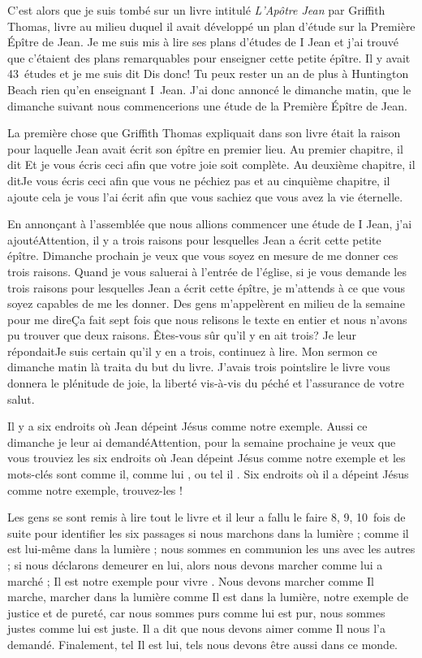 C’est alors que je suis tombé sur un livre intitulé \emph{L’Apôtre Jean} par Griffith Thomas, livre au milieu duquel il avait
développé un plan d’étude sur la Première Épître de Jean. Je me suis mis à lire ses plans d’études de I Jean et j'ai
trouvé que c’étaient des plans remarquables pour enseigner cette petite épître. Il y avait 43~études et je me suis dit\frcolon
\og Dis donc! Tu peux rester un an de plus à Huntington Beach rien qu’en enseignant I~Jean. \fg{} J'ai donc annoncé le
dimanche matin, que le dimanche suivant nous commencerions une étude de la Première Épître de Jean.

La première chose que Griffith Thomas expliquait dans son livre était la raison pour laquelle Jean avait écrit son
épître en premier lieu. Au premier chapitre, il dit \og Et je vous écris ceci afin que votre joie soit complète\fg{}. Au deuxième
chapitre, il dit\frcolon\og Je vous écris ceci afin que vous ne péchiez pas \fg{} et au cinquième chapitre, il ajoute \og cela je vous l’ai
écrit afin que vous sachiez que vous avez la vie éternelle\fg{}.

En annonçant à l'assemblée que nous allions commencer une étude de I Jean, j'ai ajouté\frcolon\og Attention, il y a trois
raisons pour lesquelles Jean a écrit cette petite épître. Dimanche prochain je veux que vous soyez en mesure de me
donner ces trois raisons. Quand je vous saluerai à l’entrée de l’église, si je vous demande les trois raisons pour
lesquelles Jean a écrit cette épître, je m’attends à ce que vous soyez capables de me les donner\fg{}. Des gens
m’appelèrent en milieu de la semaine pour me dire\frcolon\og Ça fait sept fois que nous relisons le texte en entier et nous
n'avons pu trouver que deux raisons. Êtes-vous sûr qu’il y en ait trois?\fg{} Je leur répondait\frcolon\og Je suis certain qu’il y en a
trois, continuez à lire.\fg{} Mon sermon ce dimanche matin là traita du but du livre. J’avais trois points\frcolon lire le livre vous
donnera le plénitude de joie, la liberté vis-à-vis du péché et l’assurance de votre salut.

Il y a six endroits où Jean dépeint Jésus comme notre exemple. Aussi ce dimanche je leur ai demandé\frcolon\og Attention,
pour la semaine prochaine je veux que vous trouviez les six endroits où Jean dépeint Jésus comme notre exemple et
les mots-clés sont \og comme il\fg{}, \og comme lui \fg{}, ou \og tel il \fg{}. Six endroits où il a dépeint Jésus comme notre exemple,
trouvez-les !\fg{}

Les gens se sont remis à lire tout le livre et il leur a fallu le faire 8, 9, 10~fois de suite pour identifier les six passages\frcolon
si nous marchons dans la lumière ; comme il est lui-même dans la lumière ; nous sommes en communion les uns
avec les autres ; si nous déclarons demeurer en lui, alors nous devons marcher comme lui a marché ; Il est notre
exemple pour vivre . Nous devons marcher comme Il marche, marcher dans la lumière comme Il est dans la lumière,
notre exemple de justice et de pureté, car nous sommes purs comme lui est pur, nous sommes justes comme lui est
juste. Il a dit que nous devons aimer comme Il nous l’a demandé. Finalement, tel Il est lui, tels nous devons être
aussi dans ce monde.

